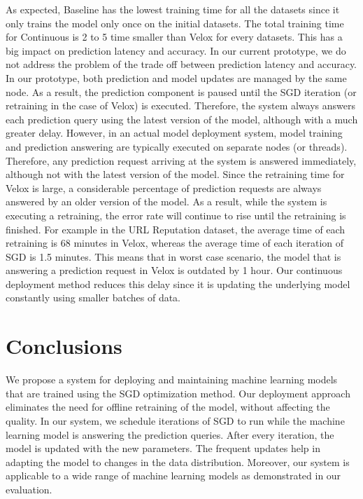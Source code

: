 \documentclass{vldb}
\begin{document}
As expected, Baseline has the lowest training time for all the datasets since it only trains the model only once on the initial datasets.
The total training time for Continuous is 2 to 5 time smaller than Velox for every datasets.
This has a big impact on prediction latency and accuracy.
In our current prototype, we do not address the problem of the trade off between prediction latency and accuracy.
In our prototype, both prediction and model updates are managed by the same node.
As a result, the prediction component is paused until the SGD iteration (or retraining in the case of Velox) is executed.
Therefore, the system always answers each prediction query using the latest version of the model, although with a much greater delay.
However, in an actual model deployment system, model training and prediction answering are typically executed on separate nodes (or threads).
Therefore, any prediction request arriving at the system is answered immediately, although not with the latest version of the model.
Since the retraining time for Velox is large, a considerable percentage of prediction requests are always answered by an older version of the model.
As a result, while the system is executing a retraining, the error rate will continue to rise until the retraining is finished.
For example in the URL Reputation dataset, the average time of each retraining is 68 minutes in Velox, whereas the average time of each iteration of SGD is 1.5 minutes.
This means that in worst case scenario, the model that is answering a prediction request in Velox is outdated by 1 hour.
Our continuous deployment method reduces this delay since it is updating the underlying model constantly using smaller batches of data.

\section{Conclusions} \label{conclusion}
We propose a system for deploying and maintaining machine learning models that are trained using the SGD optimization method.
Our deployment approach eliminates the need for offline retraining of the model, without affecting the quality.
In our system, we schedule iterations of SGD to run while the machine learning model is answering the prediction queries.
After every iteration, the model is updated with the new parameters.
The frequent updates help in adapting the model to changes in the data distribution.
Moreover, our system is applicable to a wide range of machine learning models as demonstrated in our evaluation.
\end{document}
